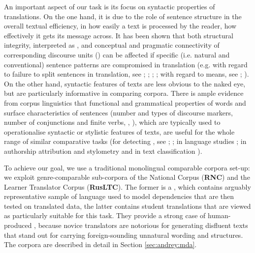 \documentclass[output=paper]{langsci/langscibook.cls}
\begin{document}
An important aspect of our task is its focus on syntactic properties of translations. On the one hand, it is due to the role of sentence structure in the overall textual efficiency, in how easily a text is processed by the reader, how effectively it gets its message across. It has been shown that both structural integrity, interpreted as , and conceptual and pragmatic connectivity of corresponding discourse units () can be affected if  specific (i.e. natural and conventional) sentence patterns are compromised in translation (e.g. with regard to failure to split sentences in translation, see \citealt{ramm2006dispensing}; \citealt{solfjeld2008sentence}; \citealt{fabricius1999information}; \citealt{gile2008local}; with regard to  means, see \citealt{kachroo1984textual}; \citealt{hatim1990discourse}). On the other hand, syntactic features of texts are less obvious to the naked eye, but are particularly informative in comparing corpora. There is ample evidence from corpus linguistics that functional and grammatical properties of words and surface characteristics of sentences (number and types of discourse markers, number of conjunctions and finite verbs, , ), which are typically used to operationalise syntactic or stylistic features of texts, are useful for the whole range of similar comparative tasks (for detecting , see \citealt{baroni2005new}; \citealt{pastor2008translation}; in  language studies \citealt{hinkel2001matters}; in authorship attribution and stylometry \citealt{Halteren:2007} and in text classification \citealt{Koppel:2002}).

To achieve our goal, we use a traditional monolingual comparable corpora set-up: we exploit genre-comparable sub-corpora of the  National Corpus (\textbf{RNC}) and the  Learner Translator Corpus (\textbf{RusLTC}). The former is a , which contains arguably representative sample of  language used to model dependencies that are then tested on translated data, the latter contains student translations that are viewed as particularly suitable for this task. They provide a strong case of human-produced , because novice translators are notorious for generating disfluent texts that stand out for carrying foreign-sounding unnatural wording and structures. The corpora are described in detail in Section \ref{sec:andrey:mda}. 
\end{document}
